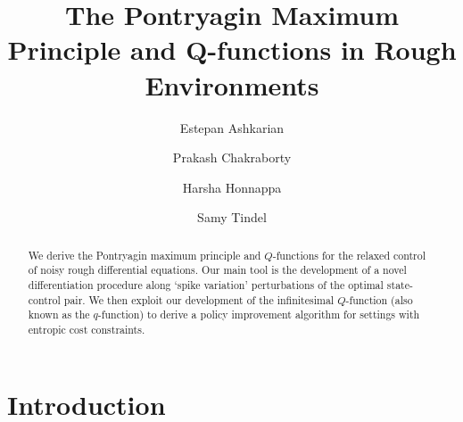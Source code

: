 \documentclass[12pt,reqno]{amsart}
\numberwithin{equation}{section}  %
\newcommand{\1}{{\bf 1}}
\newcommand{\2}{{\bf 2}}
\theoremstyle{remark}
\theoremstyle{remark}
\begin{document}
\title[Maximum Principle and Q-functions]
{The Pontryagin Maximum Principle and Q-functions in Rough Environments}

\author[E. Ashkarian]{Estepan Ashkarian}
\address{E. Ashkarian: Department of Mathematics, 
Purdue University, West Lafayette}

\author[P. Chakraborty]{Prakash Chakraborty}
\address{P. Chakraborty: Marcus Department of Industrial and Manufacturing Engineering,
The Pennsylvania State University, State College}

\author[H. Honnappa]{Harsha Honnappa}
\address{H. Honnappa: Edwardson School of Industrial Engineering, Purdue University, West Lafayette}

\author[S. Tindel]{Samy Tindel}
\address{S. Tindel: Department of Mathematics, 
Purdue University, West Lafayette}




\maketitle

\begin{abstract}
We derive the Pontryagin maximum principle and $Q$-functions for the relaxed control of noisy rough differential equations. Our main tool is the development of a novel differentiation procedure along `spike variation' perturbations of the optimal state-control pair. We then exploit our development of the infinitesimal $Q$-function (also known as the $q$-function) to derive a policy improvement algorithm for settings with entropic cost constraints.
\end{abstract}

\section{Introduction}
\end{document}
